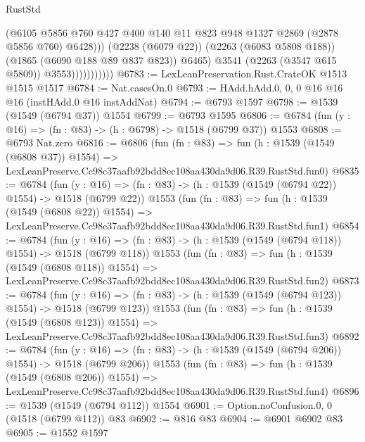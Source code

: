 \begin{lexlean}{RustStd}
\begin{coremodule}
                                (@6105
                                  @5856
                                  @760
                                  @427
                                  @400
                                  @140
                                  @11
                                  @823
                                  @948
                                  @1327
                                  @2869
                                  (@2878 @5856 @760)
                                  @6428)))
                            (@2238 (@6079 @22))
                            (@2263 (@6083 @5808 @188))
                            (@1865 (@6090 @188 @89 @837 @823))
                            @6465)
                          @3541
                          (@2263 (@3547 @615 @5809))
                          @3553)))))))))))
@6783 := LexLeanPreservation.Rust.CrateOK @1513 @1515 @1517
@6784 := Nat.casesOn.{0}
@6793 := HAdd.hAdd.{0, 0, 0} @16 @16 @16 (instHAdd.{0} @16 instAddNat)
@6794 := @6793 @1597
@6798 := @1539 (@1549 (@6794 @37)) @1554
@6799 := @6793 @1595
@6806 := @6784 (fun (y : @16) => (fn : @83) -> (h : @6798) -> @1518 (@6799 @37)) @1553
@6808 := @6793 Nat.zero
@6816 := @6806
    (fun (fn : @83) =>
    fun (h : @1539 (@1549 (@6808 @37)) @1554) =>
    LexLeanPreserve.Cc98c37aafb92bdd8ec108aa430da9d06.R39.RustStd.fun0)
@6835 := @6784
    (fun (y : @16) => (fn : @83) -> (h : @1539 (@1549 (@6794 @22)) @1554) -> @1518 (@6799 @22))
    @1553
    (fun (fn : @83) =>
    fun (h : @1539 (@1549 (@6808 @22)) @1554) =>
    LexLeanPreserve.Cc98c37aafb92bdd8ec108aa430da9d06.R39.RustStd.fun1)
@6854 := @6784
    (fun (y : @16) => (fn : @83) -> (h : @1539 (@1549 (@6794 @118)) @1554) -> @1518 (@6799 @118))
    @1553
    (fun (fn : @83) =>
    fun (h : @1539 (@1549 (@6808 @118)) @1554) =>
    LexLeanPreserve.Cc98c37aafb92bdd8ec108aa430da9d06.R39.RustStd.fun2)
@6873 := @6784
    (fun (y : @16) => (fn : @83) -> (h : @1539 (@1549 (@6794 @123)) @1554) -> @1518 (@6799 @123))
    @1553
    (fun (fn : @83) =>
    fun (h : @1539 (@1549 (@6808 @123)) @1554) =>
    LexLeanPreserve.Cc98c37aafb92bdd8ec108aa430da9d06.R39.RustStd.fun3)
@6892 := @6784
    (fun (y : @16) => (fn : @83) -> (h : @1539 (@1549 (@6794 @206)) @1554) -> @1518 (@6799 @206))
    @1553
    (fun (fn : @83) =>
    fun (h : @1539 (@1549 (@6808 @206)) @1554) =>
    LexLeanPreserve.Cc98c37aafb92bdd8ec108aa430da9d06.R39.RustStd.fun4)
@6896 := @1539 (@1549 (@6794 @112)) @1554
@6901 := Option.noConfusion.{0, 0} (@1518 (@6799 @112)) @83
@6902 := @816 @83
@6904 := @6901 @6902 @83
@6905 := @1552 @1597

\end{coremodule}
\end{lexlean}
